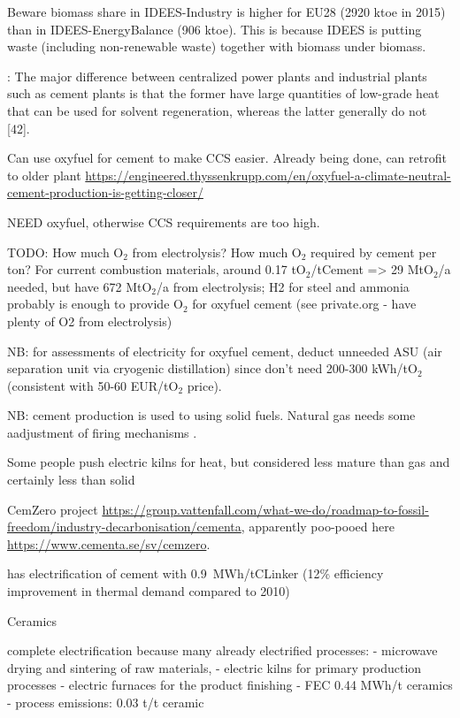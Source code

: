 Beware biomass share in IDEES-Industry is higher for EU28 (2920 ktoe in 2015)
than in IDEES-EnergyBalance (906 ktoe). This is because IDEES is putting waste
(including non-renewable waste) together with biomass under biomass.

: The major difference between centralized power plants and
industrial plants such as cement plants is that the former have large quantities
of low-grade heat that can be used for solvent regeneration, whereas the latter
generally do not [42].


Can use oxyfuel for cement to make CCS easier. Already being done, can retrofit
to older plant
\url{https://engineered.thyssenkrupp.com/en/oxyfuel-a-climate-neutral-cement-production-is-getting-closer/}

NEED oxyfuel, otherwise CCS requirements are too high.

TODO: How much O$_2$ from electrolysis? How much O$_2$ required by cement per
ton? For current combustion materials, around 0.17 tO$_2$/tCement => 29
MtO$_2$/a needed, but have 672 MtO$_2$/a from electrolysis; H2 for steel and
ammonia probably is enough to provide O$_2$ for oxyfuel cement (see private.org
- have plenty of O2 from electrolysis)

NB: for assessments of electricity for oxyfuel cement, deduct unneeded ASU (air
separation unit via cryogenic distillation) since don't need 200-300 kWh/tO$_2$
(consistent with 50-60 EUR/tO$_2$ price).

NB: cement production is used to using solid fuels. Natural gas needs some
aadjustment of firing mechanisms
.

Some people push electric kilns for heat, but considered less mature than gas
and certainly less than solid

CemZero project
\url{https://group.vattenfall.com/what-we-do/roadmap-to-fossil-freedom/industry-decarbonisation/cementa},
apparently poo-pooed here \url{https://www.cementa.se/sv/cemzero}.


 has electrification of cement with 0.9~MWh\el/tCLinker
(12\% efficiency improvement in thermal demand compared to 2010)



Ceramics

complete electrification because many already electrified processes:
- microwave drying and sintering of raw materials,
- electric kilns for primary production processes
- electric furnaces for the product finishing
- FEC 0.44 MWh/t ceramics
- process emissions: 0.03 t\co/t ceramic

